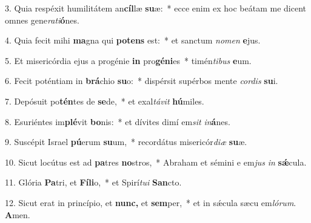 \item 3. Quia respéxit humilitátem an\textbf{cíl}læ \textbf{su}æ:~* ecce enim ex hoc beátam me dicent omnes gene\textit{rati}\textbf{ó}nes.

\item 4. Quia fecit mihi \textbf{ma}gna qui \textbf{pot}\textbf{ens} est:~* et sanctum \textit{nomen} \textbf{e}jus.

\item 5. Et misericórdia ejus a progénie \textbf{in} pro\textbf{gé}\textbf{ni}es~* timén\textit{tibus} \textbf{e}um.

\item 6. Fecit poténtiam in \textbf{brá}chio \textbf{su}o:~* dispérsit supérbos mente \textit{cordis} \textbf{su}i.

\item 7. Depósuit po\textbf{tén}tes de \textbf{se}de,~* et exal\textit{távit} \textbf{hú}miles.

\item 8. Esuriéntes im\textbf{plé}vit \textbf{bo}nis:~* et dívites dimí em\textit{sit} \textit{in}\textbf{á}nes.

\item 9. Suscépit Israel \textbf{pú}erum \textbf{su}um,~* recordátus misericór\textit{diæ} \textbf{su}æ.

\item 10. Sicut locútus est ad \textbf{pa}tres \textbf{no}stros,~* Abraham et sémini e em\textit{jus} \textit{in} \textbf{sǽ}cula.

\item 11. Glória \textbf{Pa}tri, et \textbf{Fí}\textbf{li}o,~* et Spirí\textit{tu}\textit{i} \textbf{San}cto.

\item 12. Sicut erat in princípio, et \textbf{nunc,} et \textbf{sem}per,~* et in sǽcula sæcu em\textit{ló}\textit{rum}. \textbf{A}men.

